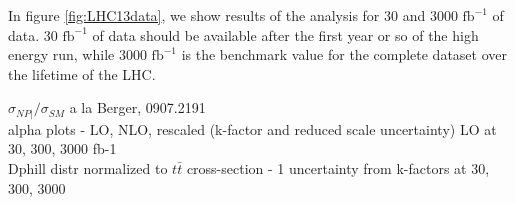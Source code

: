 \documentclass[preprint]{JHEP3} %
\def\invfb {\mathrm{fb}^{-1}}
\begin{document}
In figure \ref{fig:LHC13data}, we show results of the analysis for 30 and 3000 $\invfb$ of data. 30 $\invfb$ of data should be available after the first year or so of the high energy run, while 3000 $\invfb$ is the benchmark value for the complete dataset over the lifetime of the LHC. 

$\sigma_{NP|} / \sigma_{SM}$ a la Berger, 0907.2191 \\

alpha plots - LO, NLO, rescaled (k-factor and reduced scale uncertainty) LO at 30, 300, 3000 fb-1\\
Dphill distr normalized to $t\bar{t}$ cross-section  - 1 uncertainty from k-factors at 30, 300, 3000\\
\end{document}
